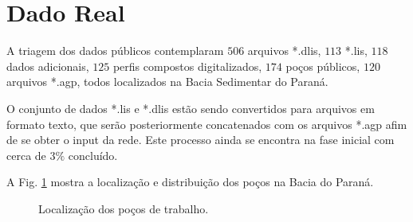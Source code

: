 \section{Dado Real}

A triagem dos dados públicos contemplaram  $506$ arquivos *.dlis, $113$ *.lis, $118$ dados adicionais, $125$ perfis compostos digitalizados, $174$ poços públicos, $120$ arquivos *.agp, todos localizados na Bacia Sedimentar do Paraná. 

O conjunto de dados *.lis e *.dlis estão sendo convertidos para arquivos em formato texto, que serão posteriormente concatenados  com os arquivos *.agp afim de se obter o input da rede. Este processo ainda se encontra na fase inicial com cerca de $3\%$ concluído.

A Fig. \ref{real} mostra a localização e distribuição dos poços na Bacia do Paraná.

\begin{figure}[H]
	\centering
	\setlength{\fboxsep}{8pt}
	\setlength{\fboxrule}{0.1pt}
	\caption{Localização dos poços de trabalho.}
	\label{real}
\end{figure}


